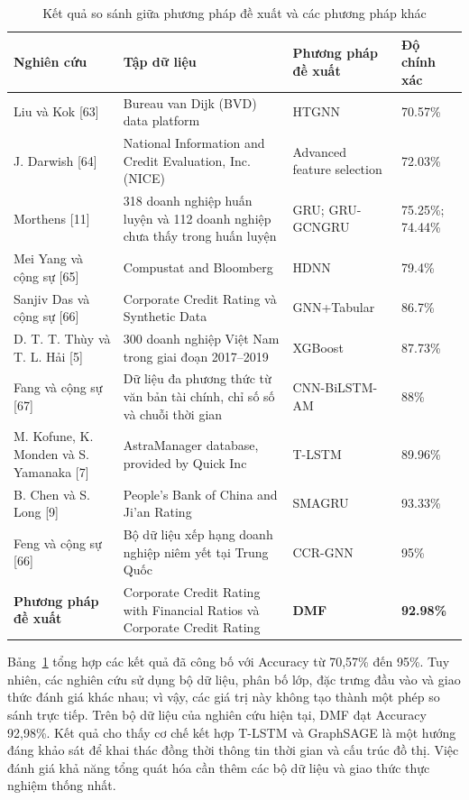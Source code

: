 \documentclass[10pt,twoside]{article}
\begin{document}
\begin{table}[H] \centering \caption{Kết quả so sánh giữa phương pháp đề xuất và các phương pháp khác} \label{tab:comparison_proposed_method} \small \renewcommand{\arraystretch}{1.35} \setlength{\tabcolsep}{4pt} \begin{tabular}{|p{3.2cm}|p{5.2cm}|p{3.0cm}|p{2.0cm}|} \hline \textbf{Nghiên cứu} & \textbf{Tập dữ liệu} & \textbf{Phương pháp đề xuất} & \textbf{Độ chính xác} \\ \hline Liu và Kok [63] & Bureau van Dijk (BVD) data platform & HTGNN & 70.57\% \\ \hline J. Darwish [64] & National Information and Credit Evaluation, Inc. (NICE) & Advanced feature selection & 72.03\% \\ \hline Morthens [11] & 318 doanh nghiệp huấn luyện và 112 doanh nghiệp chưa thấy trong huấn luyện & GRU; GRU-GCNGRU & 75.25\%; 74.44\% \\ \hline Mei Yang và cộng sự [65] & Compustat and Bloomberg & HDNN & 79.4\% \\ \hline Sanjiv Das và cộng sự [66] & Corporate Credit Rating và Synthetic Data & GNN+Tabular & 86.7\% \\ \hline D. T. T. Thùy và T. L. Hải [5] & 300 doanh nghiệp Việt Nam trong giai đoạn 2017--2019 & XGBoost & 87.73\% \\ \hline Fang và cộng sự [67] & Dữ liệu đa phương thức từ văn bản tài chính, chỉ số số và chuỗi thời gian & CNN-BiLSTM-AM & 88\% \\ \hline M. Kofune, K. Monden và S. Yamanaka [7] & AstraManager database, provided by Quick Inc & T-LSTM & 89.96\% \\ \hline B. Chen và S. Long [9] & People's Bank of China and Ji'an Rating & SMAGRU & 93.33\% \\ \hline Feng và cộng sự [66] & Bộ dữ liệu xếp hạng doanh nghiệp niêm yết tại Trung Quốc & CCR-GNN & 95\% \\ \hline \textbf{Phương pháp đề xuất} & Corporate Credit Rating with Financial Ratios và Corporate Credit Rating & \textbf{DMF} & \textbf{92.98\%} \\ \hline \end{tabular} \end{table}

Bảng~\ref{tab:comparison_proposed_method} tổng hợp các kết quả đã công bố với Accuracy từ 70,57\% đến 95\%. Tuy nhiên, các nghiên cứu sử dụng bộ dữ liệu, phân bố lớp, đặc trưng đầu vào và giao thức đánh giá khác nhau; vì vậy, các giá trị này không tạo thành một phép so sánh trực tiếp. Trên bộ dữ liệu của nghiên cứu hiện tại, DMF đạt Accuracy 92,98\%. Kết quả cho thấy cơ chế kết hợp T-LSTM và GraphSAGE là một hướng đáng khảo sát để khai thác đồng thời thông tin thời gian và cấu trúc đồ thị. Việc đánh giá khả năng tổng quát hóa cần thêm các bộ dữ liệu và giao thức thực nghiệm thống nhất.
\end{document}
